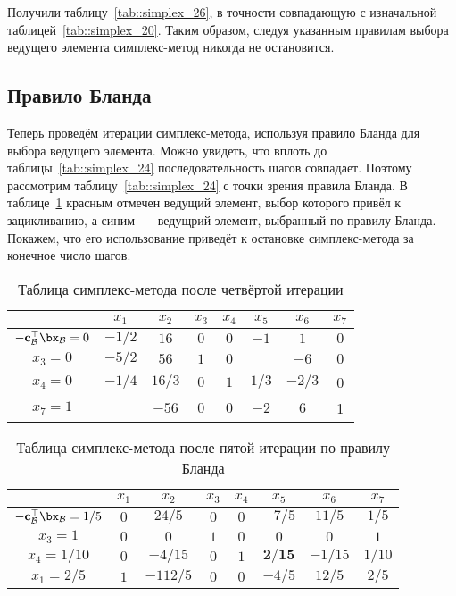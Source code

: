 \documentclass[12pt]{article}
\begin{document}
Получили таблицу~\ref{tab::simplex_26}, в точности совпадающую с изначальной таблицей~\ref{tab::simplex_20}. 
Таким образом, следуя указанным правилам выбора ведущего элемента симплекс-метод никогда не остановится.

\subsection{Правило Бланда}

Теперь проведём итерации симплекс-метода, используя правило Бланда для выбора ведущего элемента.
Можно увидеть, что вплоть до таблицы~\ref{tab::simplex_24} последовательность шагов совпадает.
Поэтому рассмотрим таблицу~\ref{tab::simplex_24} с точки зрения правила Бланда.
В таблице~\ref{tab::simplex_24_2} красным отмечен ведущий элемент, выбор которого привёл к зацикливанию, а синим~--- ведущрий элемент, выбранный по правилу Бланда.
Покажем, что его использование приведёт к остановке симплекс-метода за конечное число шагов.

\begin{table}[!ht]
\centering
\caption{Таблица симплекс-метода после четвёртой итерации}
\begin{tabular}{|c|ccccccc|}
\hline
& $x_1$ & $x_2$ & $x_3$ & $x_4$ & $x_5$ & $x_6$ & $x_7$\\
\hline
$-\mathbf{c}_{\mathcal{B}}^{\top}\bx_{\mathcal{B}} = 0$ & $-1/2$ & $16$ & $0$ & $0$ & $-1$ & $1$ & $0$ \\
\hline
$x_3 = 0$ & $-5/2$ & $56$ & $1$ & $0$ & {\color{red}{$\mathbf{2}$}} & $-6$ & $0$ \\
$x_4 = 0$ & $-1/4$ & $16/3$ & $0$ & $1$ & $1/3$ & $-2/3$ & 0 \\
$x_7 = 1$ & {\color{blue}{$\mathbf{5/2}$}} & $-56$ & $0$ & $0$ & $-2$ & $6$ & 1 \\
\hline
\end{tabular}
\label{tab::simplex_24_2}
\end{table}

\begin{table}[!ht]
\centering
\caption{Таблица симплекс-метода после пятой итерации по правилу Бланда}
\begin{tabular}{|c|ccccccc|}
\hline
& $x_1$ & $x_2$ & $x_3$ & $x_4$ & $x_5$ & $x_6$ & $x_7$\\
\hline
$-\mathbf{c}_{\mathcal{B}}^{\top}\bx_{\mathcal{B}} = 1/5$ & $0$ & $24/5$ & $0$ & $0$ & $-7/5$ & $11/5$ & $1/5$ \\
\hline
$x_3 = 1$ & $0$ & $0$ & $1$ & $0$ & $0$ & $0$ & $1$ \\
$x_4 = 1/10$ & $0$ & $-4/15$ & $0$ & $1$ & $\mathbf{2/15}$ & $-1/15$ & $1/10$ \\
$x_1 = 2/5$ & $1$ & $-112/5$ & $0$ & $0$ & $-4/5$ & $12/5$ & $2/5$ \\
\hline
\end{tabular}
\label{tab::simplex_25_2}
\end{table}
\end{document}

